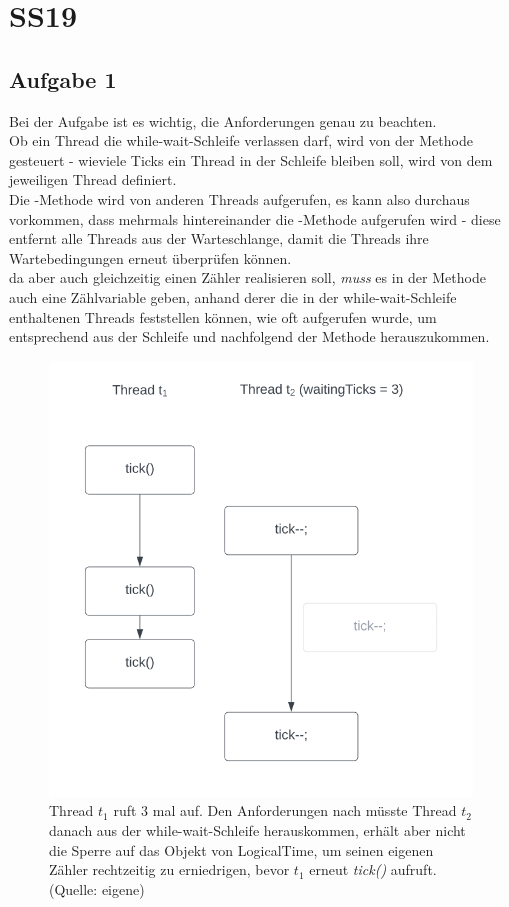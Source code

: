 \chapter{SS19}\label{ch:klausurss19}

\section{Aufgabe 1}

Bei der Aufgabe ist es wichtig, die Anforderungen genau zu beachten.\\
Ob ein Thread die while-wait-Schleife verlassen darf, wird von der Methode  gesteuert - wieviele Ticks ein Thread in der Schleife bleiben soll, wird von dem jeweiligen Thread definiert.\\
Die -Methode wird von anderen Threads aufgerufen, es kann also durchaus vorkommen, dass mehrmals hintereinander
die -Methode aufgerufen wird - diese entfernt alle Threads aus der Warteschlange, damit die Threads ihre
Wartebedingungen erneut überprüfen können.\\
da  aber auch gleichzeitig einen Zähler realisieren soll, \textit{muss} es in der Methode auch eine Zählvariable geben, anhand derer die in der while-wait-Schleife enthaltenen Threads feststellen können, wie oft  aufgerufen wurde, um entsprechend aus der Schleife und nachfolgend der Methode herauszukommen.

\begin{figure}
    \centering
    \includegraphics[scale=0.5]{chapters/Anhang/Klausuren/img/tick}
    \caption{Thread $t_1$ ruft 3 mal  auf. Den Anforderungen nach müsste Thread $t_2$ danach aus der while-wait-Schleife herauskommen, erhält aber nicht die Sperre auf das Objekt von LogicalTime, um seinen eigenen Zähler rechtzeitig zu erniedrigen, bevor $t_1$ erneut \textit{tick()} aufruft. (Quelle: eigene)}
    \label{fig:tick}
\end{figure}


